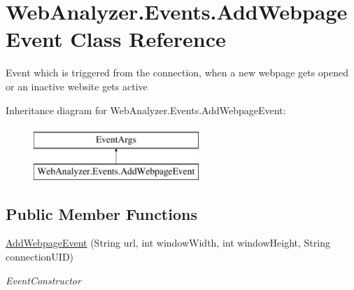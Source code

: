\hypertarget{class_web_analyzer_1_1_events_1_1_add_webpage_event}{}\section{Web\+Analyzer.\+Events.\+Add\+Webpage\+Event Class Reference}
\label{class_web_analyzer_1_1_events_1_1_add_webpage_event}


Event which is triggered from the connection, when a new webpage gets opened or an inactive website gets active  


Inheritance diagram for Web\+Analyzer.\+Events.\+Add\+Webpage\+Event\+:\begin{figure}[H]
\begin{center}
\leavevmode
\includegraphics[height=2.000000cm]{class_web_analyzer_1_1_events_1_1_add_webpage_event}
\end{center}
\end{figure}
\subsection*{Public Member Functions}
\begin{DoxyCompactItemize}
\item 
\hyperlink{class_web_analyzer_1_1_events_1_1_add_webpage_event_a6183d8c5083ac06d6f8acbc8635810c3}{Add\+Webpage\+Event} (String url, int window\+Width, int window\+Height, String connection\+U\+I\+D)
\begin{DoxyCompactList}\small\item\em Event\+Constructor \end{DoxyCompactList}\end{DoxyCompactItemize}
